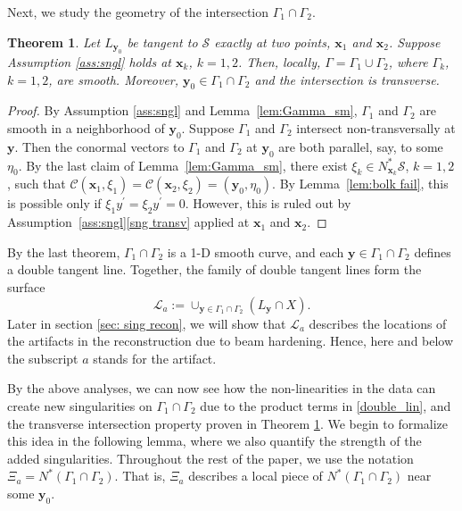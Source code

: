 \documentclass[11pt]{article}
\newcommand{\jc}[1]{\begin{quotation}\textbf{James' comment:\
}{\textit{#1}}\end{quotation}}
\newcommand{\be}{\begin{equation}}
\newcommand{\ee}{\end{equation}}
\newcommand{\s}{\mathcal S}
\newcommand{\CL}{\mathcal L}
\numberwithin{equation}{section}
\newcommand{\vy}{\mathbf{y}}
\newcommand{\vx}{\mathbf{x}}
\newtheorem{theorem}{Theorem}[section]
\theoremstyle{definition}
\begin{document}
Next, we study the geometry of the intersection $\Gamma_1\cap\Gamma_2$.

\begin{theorem}
\label{trans_int} Let $L_{\vy_0}$ be tangent to $\s$ exactly at two points, $\vx_1$ and $\vx_2$.  Suppose Assumption \ref{ass:sngl} holds at $\vx_k$, $k=1,2$. Then, locally, $\Gamma=\Gamma_1\cup\Gamma_2$, where $\Gamma_k$, $k=1,2$, are smooth. Moreover, $\vy_0\in\Gamma_1\cap\Gamma_2$ and the intersection is transverse. 
\end{theorem}

\begin{proof} By Assumption \ref{ass:sngl} and Lemma~\ref{lem:Gamma_sm}, $\Gamma_1$ and $\Gamma_2$ are smooth in a neighborhood of $\vy_0$. Suppose $\Gamma_1$ and $\Gamma_2$ intersect non-transversally at $\vy$. Then the conormal vectors to $\Gamma_1$ and $\Gamma_2$ at $\vy_0$ are both parallel, say, to some $\eta_0$. By the last claim of Lemma~\ref{lem:Gamma_sm}, there exist $\xi_k \in N_{\vx_k}^*\s$, $k=1,2$, such that $\mathcal{C}(\vx_1,\xi_1) = \mathcal{C}(\vx_2,\xi_2) = (\vy_0,\eta_0)$.  By Lemma~\ref{lem:bolk fail}, this is possible only if $\xi_1 y^\prime=\xi_2y^\prime=0$. However, this is ruled out by Assumption~\ref{ass:sngl}\eqref{sng transv} applied at $\vx_1$ and $\vx_2$.
\end{proof}

By the last theorem, $\Gamma_1\cap\Gamma_2$ is a 1-D smooth curve, and each $\vy\in \Gamma_1\cap\Gamma_2$ defines a double tangent line. 
Together, the family of double tangent lines form the surface
\be\label{art surface}
\CL_a:=\cup_{\vy\in \Gamma_1\cap\Gamma_2} (L_{\vy}\cap X).
\ee
Later in section \ref{sec: sing recon}, we will show that $\mathcal{L}_a$ describes the locations of the artifacts in the reconstruction due to beam hardening. Hence, here and below the subscript $a$ stands for the artifact. 

By the above analyses, we can now see how the non-linearities in the data can create new singularities on $\Gamma_1 \cap \Gamma_2$ due to the product terms in \eqref{double_lin}, and the transverse intersection property proven in Theorem \ref{trans_int}. We begin to formalize this idea in the following lemma, {where we also} quantify the strength of the added singularities. Throughout the rest of the paper, we use the notation $\Xi_a = N^*(\Gamma_1\cap\Gamma_2)$. That is, $\Xi_a$ describes a local piece of $N^*(\Gamma_1\cap\Gamma_2)$ near some $\vy_0$.
\end{document}
